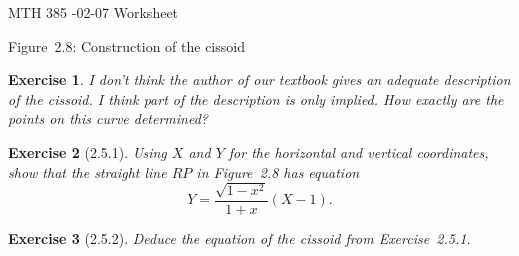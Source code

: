 \documentclass[12pt]{article}
\theoremstyle{plain}
\newtheorem{ex}{Exercise}
\begin{document}
MTH 385 -02-07 Worksheet

\begin{center}

  Figure~2.8: Construction of the cissoid
\end{center}

\begin{ex}
  I don't think the author of our textbook gives an adequate description of the cissoid. I think part of the description is only implied. How exactly are the points on this curve determined?
\end{ex}

\begin{ex} [2.5.1]
  Using $X$ and $Y$ for the horizontal and vertical coordinates, show that the straight line $RP$ in Figure~2.8 has equation
  \[
    Y=\frac{\sqrt{1-x^2}}{1+x}(X-1).
  \]
\end{ex}

\begin{ex} [2.5.2]
  Deduce the equation of the cissoid from Exercise~2.5.1.
\end{ex}
\end{document}

